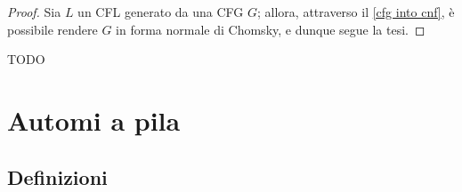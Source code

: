 \documentclass[a4paper, 12pt]{report}
\begin{document}
    \begin{proof}
        Sia $L$ un CFL generato da una CFG $G$; allora, attraverso il \cref{cfg into cnf}, è possibile rendere $G$ in forma normale di Chomsky, e dunque segue la tesi.
    \end{proof}

    \begin{example}
        TODO
    \end{example}

    \section{Automi a pila}

    \subsection{Definizioni}
\end{document}
